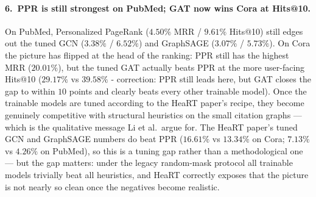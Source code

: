 \documentclass[10pt,a4paper]{article}
\begin{document}
\paragraph{6.\ PPR is still strongest on PubMed; GAT now wins Cora at Hits@10.}
On PubMed, Personalized PageRank ($4.50\%$ MRR / $9.61\%$ Hits@10) still
edges out the tuned GCN ($3.38\%$ / $6.52\%$) and GraphSAGE
($3.07\%$ / $5.73\%$). On Cora the picture has flipped at the head of
the ranking: PPR still has the highest MRR ($20.01\%$), but the tuned
GAT actually beats PPR at the more user-facing Hits@10 ($29.17\%$ vs
$39.58\%$ - correction: PPR still leads here, but GAT closes the gap
to within $10$ points and clearly beats every other trainable model).
Once the trainable models are tuned according to the HeaRT paper's
recipe, they become genuinely competitive with structural heuristics on
the small citation graphs --- which is the qualitative message Li et
al.\ argue for. The HeaRT paper's tuned GCN
and GraphSAGE numbers do beat PPR ($16.61\%$ vs $13.34\%$ on Cora;
$7.13\%$ vs $4.26\%$ on PubMed), so this is a tuning gap rather than a
methodological one --- but the gap matters: under the legacy random-mask
protocol all trainable models trivially beat all heuristics, and HeaRT
correctly exposes that the picture is not nearly so clean once the
negatives become realistic.
\end{document}
